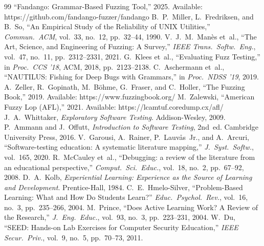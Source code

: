 \documentclass[conference]{IEEEtran}
\begin{document}
\balance

\begin{thebibliography}{99}
 ``Fandango: Grammar-Based Fuzzing Tool,'' 2025. Available: https://github.com/fandango-fuzzer/fandango
 B.~P.~Miller, L.~Fredriksen, and B.~So, ``An Empirical Study of the Reliability of UNIX Utilities,'' \emph{Commun.\ ACM}, vol.~33, no.~12, pp.~32--44, 1990.
 V.~J.~M.~Man\`{e}s et~al., ``The Art, Science, and Engineering of Fuzzing: A Survey,'' \emph{IEEE Trans.\ Softw.\ Eng.}, vol.~47, no.~11, pp.~2312--2331, 2021.
 G.~Klees et~al., ``Evaluating Fuzz Testing,'' in \emph{Proc.\ CCS '18}, ACM, 2018, pp.~2123--2138.
 C.~Aschermann et~al., ``NAUTILUS: Fishing for Deep Bugs with Grammars,'' in \emph{Proc.\ NDSS '19}, 2019.
 A.~Zeller, R.~Gopinath, M.~B\"{o}hme, G.~Fraser, and C.~Holler, ``The Fuzzing Book,'' 2019. Available: https://www.fuzzingbook.org/
 M.~Zalewski, ``American Fuzzy Lop (AFL),'' 2021. Available: https://lcamtuf.coredump.cx/afl/
 J.~A.~Whittaker, \emph{Exploratory Software Testing}. Addison-Wesley, 2009.
 P.~Ammann and J.~Offutt, \emph{Introduction to Software Testing}, 2nd~ed. Cambridge University Press, 2016.
 V.~Garousi, A.~Rainer, P.~Lauv\aa{}s~Jr., and A.~Arcuri, ``Software-testing education: A systematic literature mapping,'' \emph{J.\ Syst.\ Softw.}, vol.~165, 2020.
 R.~McCauley et~al., ``Debugging: a review of the literature from an educational perspective,'' \emph{Comput.\ Sci.\ Educ.}, vol.~18, no.~2, pp.~67--92, 2008.
 D.~A.~Kolb, \emph{Experiential Learning: Experience as the Source of Learning and Development}. Prentice-Hall, 1984.
 C.~E.~Hmelo-Silver, ``Problem-Based Learning: What and How Do Students Learn?'' \emph{Educ.\ Psychol.\ Rev.}, vol.~16, no.~3, pp.~235--266, 2004.
 M.~Prince, ``Does Active Learning Work? A Review of the Research,'' \emph{J.\ Eng.\ Educ.}, vol.~93, no.~3, pp.~223--231, 2004.
 W.~Du, ``SEED: Hands-on Lab Exercises for Computer Security Education,'' \emph{IEEE Secur.\ Priv.}, vol.~9, no.~5, pp.~70--73, 2011.
\end{thebibliography}
\end{document}
